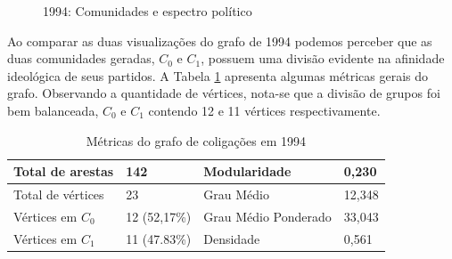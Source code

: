 \begin{figure}[H]
\center
    \qquad
    
    \caption{1994: Comunidades e espectro político}
\end{figure}

Ao comparar as duas visualizações do grafo de 1994 podemos perceber que as duas comunidades geradas, $C_0$ e $C_1$, possuem uma divisão evidente na afinidade ideológica de seus partidos. A Tabela \ref{table-1994} apresenta algumas métricas gerais do grafo. Observando a quantidade de vértices, nota-se que a divisão de grupos foi bem balanceada, $C_0$ e $C_1$ contendo 12 e 11 vértices respectivamente.

\begin{table}[H]
\centering
\label{table-1994}
\begin{tabular}{|l|l|l|l|}
\hline
Total de arestas  & 142 & Modularidade         & 0,230 \\ \hline
Total de vértices & 23   & Grau Médio           & 12,348 \\ \hline
Vértices em $C_0$    & 12 (52,17\%)  & Grau Médio Ponderado & 33,043 \\ \hline
Vértices em $C_1$    & 11 (47.83\%) & Densidade            &  0,561\\ \hline
\end{tabular}
\caption{Métricas do grafo de coligações em 1994}
\end{table}

